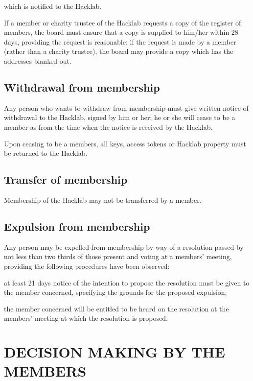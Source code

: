 \documentclass{article}
\begin{document}
\subclause which is notified to the Hacklab.

\clause If a member or charity trustee of the Hacklab requests a copy
of the register of members, the board must ensure that a copy is
supplied to him/her within 28 days, providing the request is
reasonable; if the request is made by a member (rather than a charity
trustee), the board may provide a copy which has the addresses blanked
out.

\subsection{Withdrawal from membership}

\clause Any person who wants to withdraw from membership must give
written notice of withdrawal to the Hacklab, signed by him or her; he
or she will cease to be a member as from the time when the notice is
received by the Hacklab.

\clause Upon ceasing to be a members, all keys, access tokens or
Hacklab property must be returned to the Hacklab.

\subsection{Transfer of  membership}

\clause Membership of the Hacklab may not be transferred by a member.

\subsection{Expulsion from membership}

\clause Any person may be expelled from membership by way of a
resolution passed by not less than two thirds of those present and
voting at a members' meeting, providing the following procedures have
been observed:

\subclause at least 21 days notice of the intention to propose the
resolution must be given to the member concerned, specifying the
grounds for the proposed expulsion;

\subclause the member concerned will be entitled to be heard on the
resolution at the members' meeting at which the resolution is
proposed.

\section {DECISION MAKING BY THE MEMBERS}
\end{document}
